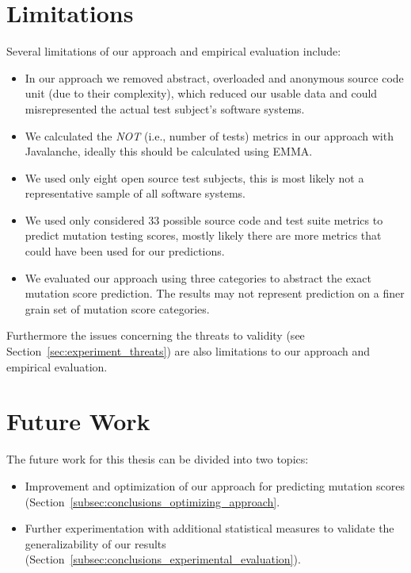 \section{Limitations}
\label{sec:conclusions_limitations}
Several limitations of our approach and empirical evaluation include:

\begin{itemize}
	\item In our approach we removed abstract, overloaded and anonymous source code unit (due to their complexity), which reduced our usable data and could misrepresented the actual test subject's software systems.
	\item We calculated the \emph{NOT} (i.e., number of tests) metrics in our approach with Javalanche, ideally this should be calculated using EMMA.
	\item We used only eight open source test subjects, this is most likely not a representative sample of all software systems.
	\item We used only considered 33 possible source code and test suite metrics to predict mutation testing scores, mostly likely there are more metrics that could have been used for our predictions.
	\item We evaluated our approach using three categories to abstract the exact mutation score prediction. The results may not represent prediction on a finer grain set of mutation score categories.
\end{itemize}

Furthermore the issues concerning the threats to validity (see Section~\ref{sec:experiment_threats}) are also limitations to our approach and empirical evaluation.


\section{Future Work}
\label{sec:conclusions_future_work}
The future work for this thesis can be divided into two topics:

\begin{itemize}
  \item Improvement and optimization of our approach for predicting mutation scores (Section~\ref{subsec:conclusions_optimizing_approach}.
  \item Further experimentation with additional statistical measures to validate the generalizability of our results (Section~\ref{subsec:conclusions_experimental_evaluation}).
\end{itemize}

